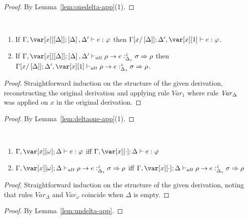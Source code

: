 \documentclass[acmsmall,review,anonymous,screen]{acmart}
\begin{document}
\begin{proof}
By Lemma~\ref{lem:onedelta-app}(1).
\end{proof}



\begin{lemma}~\label{lem:deltaone-app}

  \begin{enumerate}
 \item If $\G,\x[\irr{\D}]; \irr{\D},\D' \vdash e : \vp$
   then $\G[x/\irr{\D}]; \D',\xl \vdash e :\vp$.
 \item If $\G ,\x[\irr{\D}]; \irr{\D}, \D' \vdash_{alt} \rho \rightarrow e
   :^z_{\Delta_s} \sigma \Rightarrow \rho$ then
   $\G[x/\irr{\D}];\D',\xl \vdash_{alt} \rho \rightarrow e
   :^z_{\Delta_s} \sigma \Rightarrow \rho$.
  \end{enumerate}
\end{lemma}
\begin{proof}
Straightforward induction on the structure of the given derivation,
reconstructing the original derivation and applying rule
$\mathit{Var}_1$ where rule $\mathit{Var}_\Delta$ was applied on
$x$ in the original derivation.
\end{proof}



\deltaone*
\begin{proof}
By Lemma~\ref{lem:deltaone-app}(1).
\end{proof}

\begin{lemma}~\label{lem:undelta-app}
  \begin{enumerate}
    \item $\G,\xo; \D \vdash e : \vp$ iff $\G,\x[\cdot]; \D \vdash e :
      \vp$
    \item $\G,\xo;\D \vdash_{alt} \rho \rightarrow e
      :^z_{\Delta_s} \sigma \Rightarrow \rho$ iff
      $\G,\x[\cdot];\D \vdash_{alt} \rho \rightarrow e
   :^z_{\Delta_s} \sigma \Rightarrow \rho$
  \end{enumerate}
\end{lemma}
\begin{proof}
Straightforward induction on the structure of the given derivation,
noting that rules $\mathit{Var}_\Delta$ and $\mathit{Var}_\omega$
coincide when $\Delta$ is empty.
\end{proof}

\undelta*

\begin{proof}
By Lemma~\ref{lem:undelta-app}.
\end{proof}
\end{document}
